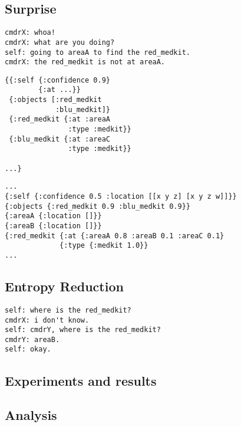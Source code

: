 \documentclass[12pt]{article}
\begin{document}
\subsection{Surprise}

\begin{verbatim}
cmdrX: whoa!
cmdrX: what are you doing?
self: going to areaA to find the red_medkit.
cmdrX: the red_medkit is not at areaA.
\end{verbatim}

\begin{verbatim}
{{:self {:confidence 0.9}
        {:at ...}}
 {:objects [:red_medkit
            :blu_medkit]}
 {:red_medkit {:at :areaA
               :type :medkit}}
 {:blu_medkit {:at :areaC
               :type :medkit}}

...}
\end{verbatim}

\begin{verbatim}
...
{:self {:confidence 0.5 :location [[x y z] [x y z w]]}}
{:objects {:red_medkit 0.9 :blu_medkit 0.9}}
{:areaA {:location []}}
{:areaB {:location []}}
{:red_medkit {:at {:areaA 0.8 :areaB 0.1 :areaC 0.1}
             {:type {:medkit 1.0}}
...
\end{verbatim}

\subsection{Entropy Reduction}
\begin{verbatim}
self: where is the red_medkit?
cmdrX: i don't know.
self: cmdrY, where is the red_medkit?
cmdrY: areaB.
self: okay.
\end{verbatim}

\subsection{Experiments and results}
\label{sec:experiments}


\subsection{Analysis}
\label{sec:analysis}
\end{document}
